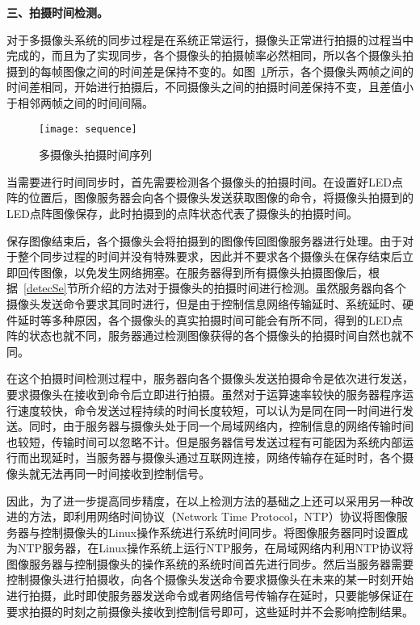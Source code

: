 \textbf{三、拍摄时间检测。}

对于多摄像头系统的同步过程是在系统正常运行，摄像头正常进行拍摄的过程当中完成的，而且为了实现同步，各个摄像头的拍摄帧率必然相同，所以各个摄像头拍摄到的每帧图像之间的时间差是保持不变的。如图~\ref{sequence}所示，各个摄像头两帧之间的时间差相同，开始进行拍摄后，不同摄像头之间的拍摄时间差保持不变，且差值小于相邻两帧之间的时间间隔。

\begin{figure}[h] 
  \centering
  \texttt{[image: sequence]}
  \caption{多摄像头拍摄时间序列}
    \label{sequence}
\end{figure}

当需要进行时间同步时，首先需要检测各个摄像头的拍摄时间。在设置好LED点阵的位置后，图像服务器会向各个摄像头发送获取图像的命令，将摄像头拍摄到的LED点阵图像保存，此时拍摄到的点阵状态代表了摄像头的拍摄时间。

保存图像结束后，各个摄像头会将拍摄到的图像传回图像服务器进行处理。由于对于整个同步过程的时间并没有特殊要求，因此并不要求各个摄像头在保存结束后立即回传图像，以免发生网络拥塞。在服务器得到所有摄像头拍摄图像后，根据~\ref{detecSe}节所介绍的方法对于摄像头的拍摄时间进行检测。虽然服务器向各个摄像头发送命令要求其同时进行，但是由于控制信息网络传输延时、系统延时、硬件延时等多种原因，各个摄像头的真实拍摄时间可能会有所不同，得到的LED点阵的状态也就不同，服务器通过检测图像获得的各个摄像头的拍摄时间自然也就不同。

在这个拍摄时间检测过程中，服务器向各个摄像头发送拍摄命令是依次进行发送，要求摄像头在接收到命令后立即进行拍摄。虽然对于运算速率较快的服务器程序运行速度较快，命令发送过程持续的时间长度较短，可以认为是同在同一时间进行发送。同时，由于服务器与摄像头处于同一个局域网络内，控制信息的网络传输时间也较短，传输时间可以忽略不计。但是服务器信号发送过程有可能因为系统内部运行而出现延时，当服务器与摄像头通过互联网连接，网络传输存在延时时，各个摄像头就无法再同一时间接收到控制信号。

因此，为了进一步提高同步精度，在以上检测方法的基础之上还可以采用另一种改进的方法，即利用网络时间协议（Network Time Protocol，NTP）协议将图像服务器与控制摄像头的Linux操作系统进行系统时间同步。将图像服务器同时设置成为NTP服务器，在Linux操作系统上运行NTP服务，在局域网络内利用NTP协议将图像服务器与控制摄像头的操作系统的系统时间首先进行同步。然后当服务器需要控制摄像头进行拍摄收，向各个摄像头发送命令要求摄像头在未来的某一时刻开始进行拍摄，此时即使服务器发送命令或者网络信号传输存在延时，只要能够保证在要求拍摄的时刻之前摄像头接收到控制信号即可，这些延时并不会影响控制结果。

